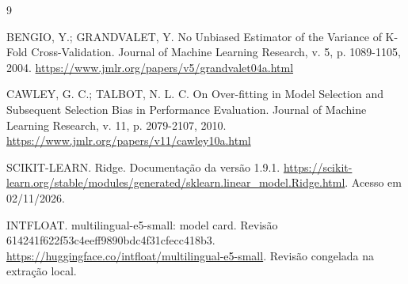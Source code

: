 \begin{thebibliography}{9}

BENGIO, Y.; GRANDVALET, Y. No Unbiased Estimator of the Variance of K-Fold Cross-Validation. Journal of Machine Learning Research, v. 5, p. 1089-1105, 2004. \url{https://www.jmlr.org/papers/v5/grandvalet04a.html}

CAWLEY, G. C.; TALBOT, N. L. C. On Over-fitting in Model Selection and Subsequent Selection Bias in Performance Evaluation. Journal of Machine Learning Research, v. 11, p. 2079-2107, 2010. \url{https://www.jmlr.org/papers/v11/cawley10a.html}

SCIKIT-LEARN. Ridge. Documentação da versão 1.9.1. \url{https://scikit-learn.org/stable/modules/generated/sklearn.linear_model.Ridge.html}. Acesso em 02/11/2026.

INTFLOAT. multilingual-e5-small: model card. Revisão 614241f622f53c4eeff9890bdc4f31cfecc418b3. \url{https://huggingface.co/intfloat/multilingual-e5-small}. Revisão congelada na extração local.

\end{thebibliography}
